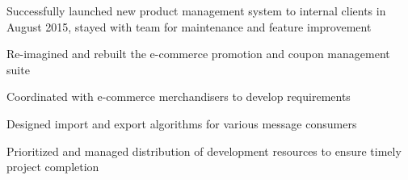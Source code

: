 \begin{cventries}
{\begin{cvitems}
\begin{cvitemssub}
                        \item{Successfully launched new product management system to internal clients in August 2015, stayed with team for maintenance and feature improvement}
                    \end{cvitemssub}
                \item{Re-imagined and rebuilt the e-commerce promotion and coupon management suite}
                    \begin{cvitemssub}
                        \item{Coordinated with e-commerce merchandisers to develop requirements}
                        \item{Designed import and export algorithms for various message consumers}
                        \item{Prioritized and managed distribution of development resources to ensure timely project completion}
                    \end{cvitemssub}
          \end{cvitems}
    }
 

\end{cventries}
